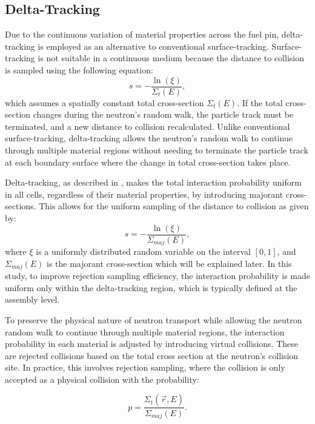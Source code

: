 \subsection{Delta-Tracking} \label{sec23}
Due to the continuous variation of material properties across the fuel pin, delta-tracking is employed as an alternative to conventional surface-tracking. Surface-tracking is not suitable in a continuous medium because the distance to collision is sampled using the following equation:
\begin{equation}
    s = -\frac{\ln(\xi)}{\Sigma_{t}(E)},
    \label{eq8}
\end{equation}
which assumes a spatially constant total cross-section $\Sigma_{t}(E)$. If the total cross-section changes during the neutron's random walk, the particle track must be terminated, and a new distance to collision recalculated. Unlike conventional surface-tracking, delta-tracking allows the neutron's random walk to continue through multiple material regions without needing to terminate the particle track at each boundary surface where the change in total cross-section takes place.

Delta-tracking, as described in \cite{leppanen_2017, woodcock}, makes the total interaction probability uniform in all cells, regardless of their material properties, by introducing majorant cross-sections. This allows for the uniform sampling of the distance to collision as given by:
\begin{equation}
    s = -\frac{\ln{\left(\xi\right)}}{\Sigma_{maj}(E)},
    \label{eq8}
\end{equation}
where \(\xi\) is a uniformly distributed random variable on the interval \([0,1]\), and \(\Sigma_{maj}(E)\) is the majorant cross-section which will be explained later. In this study, to improve rejection sampling efficiency, the interaction probability is made uniform only within the delta-tracking region, which is typically defined at the assembly level. 

To preserve the physical nature of neutron transport while allowing the neutron random walk to continue through multiple material regions, the interaction probability in each material is adjusted by introducing virtual collisions. These are rejected collisions based on the total cross section at the neutron's collision site. In practice, this involves rejection sampling, where the collision is only accepted as a physical collision with the probability:

\begin{equation}
    p = \frac{\Sigma_t(\vec{r},E)}{\Sigma_{maj}(E)}.
    \label{eq9}
\end{equation}

